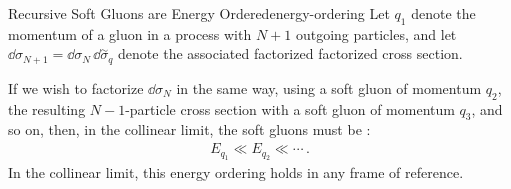 \begin{lemma}{Recursive Soft Gluons are Energy Ordered}{energy-ordering}
    Let \(q_1\) denote the momentum of a  gluon in a process with \(N+1\) outgoing particles, and let \(\dd \sigma_{N+1} = \dd\sigma_N \,\dd\overset{\sim}{\sigma}_q\) denote the associated factorized factorized cross section.

    If we wish to factorize \(\dd \sigma_{N}\) in the same way, using a soft gluon of momentum \(q_2\), the resulting \(N-1\)-particle cross section with a soft gluon of momentum \(q_3\), and so on, then, in the collinear limit, the soft gluons must be :
    \begin{align}
        E_{q_1} \ll E_{q_2} \ll \cdots
        \,.
    \end{align}
    In the collinear limit, this energy ordering holds in any frame of reference.
\end{lemma}

